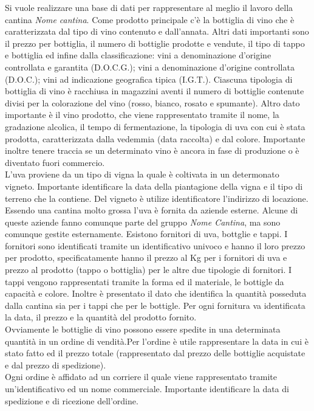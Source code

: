 Si vuole realizzare una base di dati per rappresentare al meglio il lavoro della cantina \emph{Nome cantina}. Come prodotto principale c'è la bottiglia di vino che è caratterizzata dal tipo di vino contenuto e dall'annata. Altri dati importanti sono il prezzo per bottiglia, il numero di bottiglie prodotte e vendute, il tipo di tappo e bottiglia ed infine dalla classificazione: vini a denominazione d'origine controllata e garantita (D.O.C.G.); vini a denominazione d'origine controllata (D.O.C.); vini ad indicazione geografica tipica (I.G.T.). Ciascuna tipologia di bottiglia di vino è racchiusa in magazzini aventi il numero di bottiglie contenute divisi per la colorazione del vino (rosso, bianco, rosato e spumante).
Altro dato importante è il vino prodotto, che viene rappresentato tramite il nome, la gradazione alcolica, il tempo di fermentazione, la tipologia di uva con cui è stata prodotta, caratterizzata dalla vedemmia (data raccolta) e dal colore. Importante inoltre tenere traccia se un determinato vino è ancora in fase di produzione o è diventato fuori commercio.\\
L'uva proviene da un tipo di vigna la quale è coltivata in un determonato vigneto. Importante identificare la data della piantagione della vigna e il tipo di terreno che la contiene. Del vigneto è utilize identificatore l'indirizzo di locazione.\\
Essendo una cantina molto grossa l'uva è fornita da aziende esterne. Alcune di queste aziende fanno comunque parte del gruppo \emph{Nome Cantina}, ma sono comunque gestite esternamente. Esistono fornitori di uva, bottglie e tappi.
I fornitori sono identificati tramite un identificativo univoco e hanno il loro prezzo per prodotto, specificatamente hanno il prezzo al Kg per i fornitori di uva e prezzo al prodotto (tappo o bottiglia) per le altre due tipologie di fornitori.
I tappi vengono rappresentati tramite la forma ed il materiale, le bottigle da capacità e colore. Inoltre è presentato il dato che identifica la quantità posseduta dalla cantina sia per i tappi che per le bottigle. Per ogni fornitura va identificata la data, il prezzo e la quantità del prodotto fornito.\\
Ovviamente le bottiglie di vino possono essere spedite in una determinata quantità in un ordine di vendità.Per l'ordine è utile rappresentare la data in cui è stato fatto ed il prezzo totale (rappresentato dal prezzo delle bottiglie acquistate e dal prezzo di spedizione).\\
Ogni ordine è affidato ad un corriere il quale viene rappresentato tramite un'identificativo ed un nome commerciale. Importante identificare la data  di spedizione e di ricezione dell'ordine.\\
